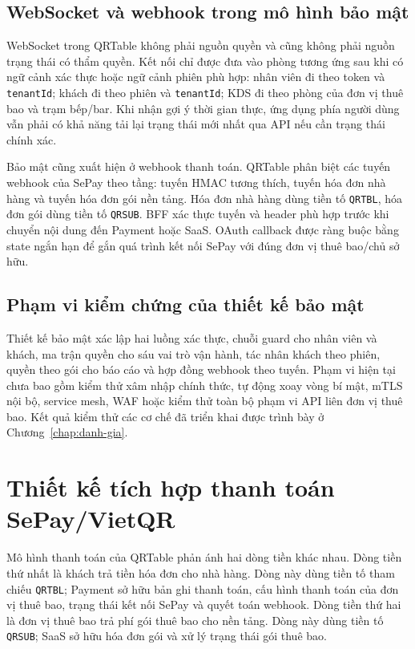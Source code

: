 \subsection{WebSocket và webhook trong mô hình bảo mật}

WebSocket trong QRTable không phải nguồn quyền và cũng không phải nguồn trạng thái có thẩm quyền. Kết nối chỉ được đưa vào phòng tương ứng sau khi có ngữ cảnh xác thực hoặc ngữ cảnh phiên phù hợp: nhân viên đi theo token và \texttt{tenantId}; khách đi theo phiên và \texttt{tenantId}; KDS đi theo phòng của đơn vị thuê bao và trạm bếp/bar. Khi nhận gợi ý thời gian thực, ứng dụng phía người dùng vẫn phải có khả năng tải lại trạng thái mới nhất qua API nếu cần trạng thái chính xác.

Bảo mật cũng xuất hiện ở webhook thanh toán. QRTable phân biệt các tuyến webhook của SePay theo tầng: tuyến HMAC tương thích, tuyến hóa đơn nhà hàng và tuyến hóa đơn gói nền tảng. Hóa đơn nhà hàng dùng tiền tố \texttt{QRTBL}, hóa đơn gói dùng tiền tố \texttt{QRSUB}. BFF xác thực tuyến và header phù hợp trước khi chuyển nội dung đến Payment hoặc SaaS. OAuth callback được ràng buộc bằng state ngắn hạn để gắn quá trình kết nối SePay với đúng đơn vị thuê bao/chủ sở hữu.

\subsection{Phạm vi kiểm chứng của thiết kế bảo mật}

Thiết kế bảo mật xác lập hai luồng xác thực, chuỗi guard cho nhân viên và khách, ma trận quyền cho sáu vai trò vận hành, tác nhân khách theo phiên, quyền theo gói cho báo cáo và hợp đồng webhook theo tuyến. Phạm vi hiện tại chưa bao gồm kiểm thử xâm nhập chính thức, tự động xoay vòng bí mật, mTLS nội bộ, service mesh, WAF hoặc kiểm thử toàn bộ phạm vi API liên đơn vị thuê bao. Kết quả kiểm thử các cơ chế đã triển khai được trình bày ở Chương~\ref{chap:danh-gia}.

\section{Thiết kế tích hợp thanh toán SePay/VietQR}

Mô hình thanh toán của QRTable phản ánh hai dòng tiền khác nhau. Dòng tiền thứ nhất là khách trả tiền hóa đơn cho nhà hàng. Dòng này dùng tiền tố tham chiếu \texttt{QRTBL}; Payment sở hữu bản ghi thanh toán, cấu hình thanh toán của đơn vị thuê bao, trạng thái kết nối SePay và quyết toán webhook. Dòng tiền thứ hai là đơn vị thuê bao trả phí gói thuê bao cho nền tảng. Dòng này dùng tiền tố \texttt{QRSUB}; SaaS sở hữu hóa đơn gói và xử lý trạng thái gói thuê bao.

